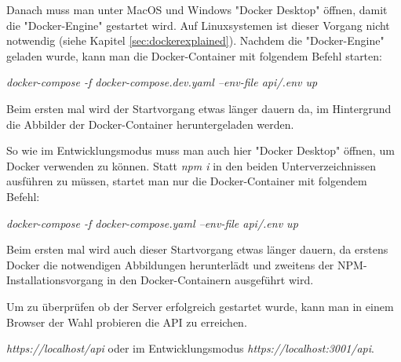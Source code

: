 Danach muss man unter MacOS und Windows "Docker Desktop" öffnen, damit die "Docker-Engine" gestartet wird. Auf Linuxsystemen ist dieser Vorgang nicht notwendig (siehe Kapitel \ref{sec:dockerexplained}). Nachdem die "Docker-Engine" geladen wurde, kann man die Docker-Container mit folgendem Befehl starten:

\emph{docker-compose -f docker-compose.dev.yaml --env-file api/.env up}  

Beim ersten mal wird der Startvorgang etwas länger dauern da, im Hintergrund die Abbilder der Docker-Container heruntergeladen werden.


So wie im Entwicklungsmodus muss man auch hier "Docker Desktop" öffnen, um Docker verwenden zu können. Statt \emph{npm i} in den beiden Unterverzeichnissen ausführen zu müssen, startet man nur die Docker-Container mit folgendem Befehl:

\emph{docker-compose -f docker-compose.yaml --env-file api/.env up}

Beim ersten mal wird auch dieser Startvorgang etwas länger dauern, da erstens Docker die notwendigen Abbildungen herunterlädt und zweitens der NPM-Installationsvorgang in den Docker-Containern ausgeführt wird.

Um zu überprüfen ob der Server erfolgreich gestartet wurde, kann man in einem Browser der Wahl probieren die API zu erreichen. 

\emph{https://localhost/api} oder im Entwicklungsmodus \emph{https://localhost:3001/api}.